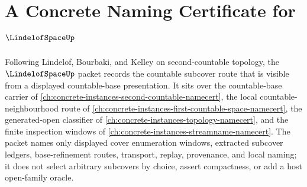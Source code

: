 \chapter{A Concrete Naming Certificate for $\LindelofSpaceUp$}
\label{ch:concrete-instances-lindelof-space-namecert}

Following Lindelof, Bourbaki, and Kelley on second-countable topology, the $\LindelofSpaceUp$ packet records the countable subcover route that is visible from a displayed countable-base presentation. It sits over the countable-base carrier of \autoref{ch:concrete-instances-second-countable-namecert}, the local countable-neighbourhood route of \autoref{ch:concrete-instances-first-countable-space-namecert}, the generated-open classifier of \autoref{ch:concrete-instances-topology-namecert}, and the finite inspection windows of \autoref{ch:concrete-instances-streamname-namecert}. The packet names only displayed cover enumeration windows, extracted subcover ledgers, base-refinement routes, transport, replay, provenance, and local naming; it does not select arbitrary subcovers by choice, assert compactness, or add a host open-family oracle.

